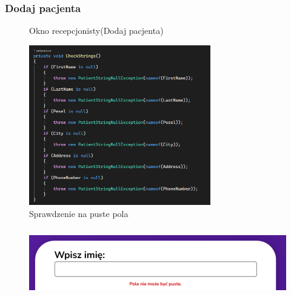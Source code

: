 \begin{flushleft}
    \subsubsection{\large{Dodaj pacjenta}}
    \begin{figure}[H]
    \centering
    \caption{Okno recepcjonisty(Dodaj pacjenta)}
    \end{figure}
    \begin{figure}[H]
        \begin{center}
	\includegraphics[height=7cm]{images/spraw_null.png}
        \caption{Sprawdzenie na puste pola}
        \label{fig:spraw_null}
	\end{center}
    \end{figure}
    \begin{figure}[H]
        \begin{center}
	\includegraphics[height=3cm]{images/blad_wpisz_im.png}

\end{center}
\end{figure}
\end{flushleft}
